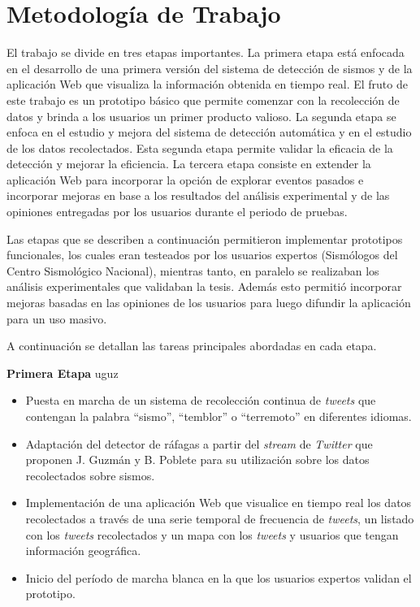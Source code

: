 \section{Metodología de Trabajo}

El trabajo se divide en tres etapas importantes. La primera etapa está enfocada en el desarrollo de una primera versión del sistema de detección de sismos y de la aplicación Web que visualiza la información obtenida en tiempo real. El fruto de este trabajo es un prototipo básico que permite comenzar con la recolección de datos y brinda a los usuarios un primer producto valioso. La segunda etapa se enfoca en el estudio y mejora del sistema de detección automática y en el estudio de los datos recolectados. Esta segunda etapa permite validar la eficacia de la detección y mejorar la eficiencia. La tercera etapa consiste en extender la aplicación Web para incorporar la opción de explorar eventos pasados e incorporar mejoras en base a los resultados del análisis experimental y de las opiniones entregadas por los usuarios durante el periodo de pruebas.

Las etapas que se describen a continuación permitieron implementar prototipos funcionales, los cuales eran testeados por los usuarios expertos (Sismólogos del Centro Sismológico Nacional), mientras tanto, en paralelo se realizaban los análisis experimentales que validaban la tesis. Además esto permitió incorporar mejoras basadas en las opiniones de los usuarios para luego difundir la aplicación para un uso masivo. 

A continuación se detallan las tareas principales abordadas en cada etapa.

\textbf{Primera Etapa}
uguz
\begin{itemize}

\item Puesta en marcha de un sistema de recolección continua de \textit{tweets} que contengan la palabra ``sismo'', ``temblor'' o ``terremoto'' en diferentes idiomas. 
\item Adaptación del detector de ráfagas a partir del \textit{stream} de \textit{Twitter} que proponen J. Guzmán y B. Poblete \cite{guzman2013line} para su utilización sobre los datos recolectados sobre sismos.
\item Implementación de una aplicación Web que visualice en tiempo real los datos recolectados a través de una serie temporal de frecuencia de \textit{tweets}, un listado con los \textit{tweets} recolectados y un mapa con los \textit{tweets} y usuarios que tengan información geográfica.
\item Inicio del período de marcha blanca en la que los usuarios expertos validan el prototipo.

\end{itemize}

